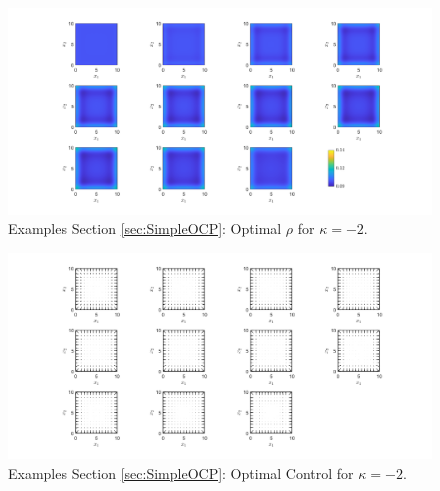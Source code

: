 \documentclass[11pt, a4paper]{article}
\theoremstyle{definition}
\begin{document}
	\begin{figure}[h]
		\centering
		\includegraphics[scale=0.35]{Simplerhokn.png}
		\caption{Examples Section \ref{sec:SimpleOCP}: Optimal $\rho$ for $\kappa = -2$.} 
		\label{FSa}
	\end{figure}
	\begin{figure}[h]
		\centering
		\includegraphics[scale=0.35]{SimpleConkn.png}
		\caption{Examples Section \ref{sec:SimpleOCP}: Optimal Control for $\kappa = -2$.} 
		\label{FSb}
	\end{figure}
	
\end{document}
